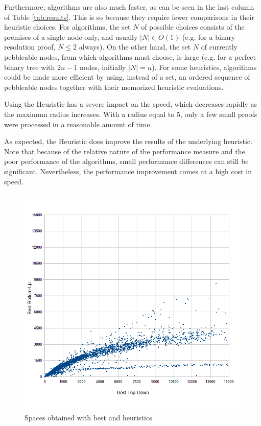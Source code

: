 \documentclass{llncs}
\begin{document}
Furthermore,  algorithms are also much faster, as can be seen in the last column of Table \ref{tab:results}. This is so because they require fewer comparisons in their heuristic choices. For  algorithms, the set $N$ of possible choices consists of the premises of a single node only, and usually $|N| \in O(1)$ (e.g. for a binary resolution proof, $N \leq 2$ always). On the other hand, the set $N$ of currently pebbleable nodes, from which  algorithms must choose, is large (e.g. for a perfect binary tree with $2n -1$ nodes, initially $|N| = n$). For some heuristics,  algorithms could be made more efficient by using, instead of a set, an ordered sequence of pebbleable nodes together with their memorized heuristic evaluations.

Using the  Heuristic has a severe impact on the speed, which decreases rapidly as the maximum radius increases. With a radius equal to 5, only a few small proofs were processed in a reasonable amount of time.

As expected, the  Heuristic does improve the results of the underlying heuristic. Note that because of the relative nature of the performance measure and the poor performance of the  algorithms, small performance differences can still be significant. Nevertheless, the performance improvement comes at a high cost in speed.


\begin{figure}[tb]
	\centering
	\includegraphics[scale=0.5]{Figures/TD_vs_BU-scatter_min.png}
	\caption{Spaces obtained with best  and  heuristics}
	\label{fig:BUvsTD}
\end{figure}
\end{document}
